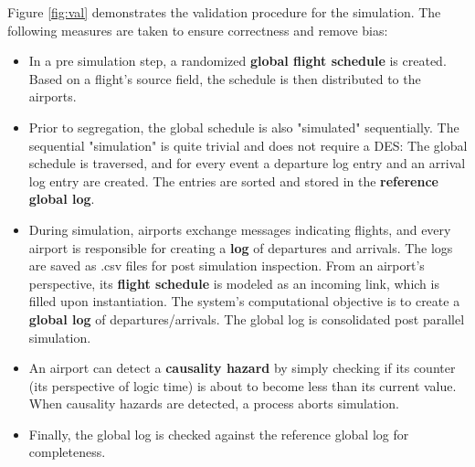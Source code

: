 \documentclass[11pt]{article}
\begin{document}
Figure \ref{fig:val} demonstrates the validation procedure for the simulation.
The following measures are taken to ensure correctness and remove bias:
\begin{itemize}
\item In a pre simulation step, a randomized \textbf{global flight schedule} is created.
Based on a flight's source field, the schedule is then distributed to the airports.
\item Prior to segregation, the global schedule is also "simulated" sequentially. 
The sequential "simulation" is quite trivial and does not require a DES:
The global schedule is traversed, and for every event a departure log entry and an arrival log entry are created.
The entries are sorted and stored in the \textbf{reference global log}.
\item During simulation, airports exchange messages indicating flights, and every airport is responsible for creating a \textbf{log} of departures and arrivals.
The logs are saved as .csv files for post simulation inspection.
From an airport's perspective, its \textbf{flight schedule} is modeled as an incoming link, which is filled upon instantiation.
The system's computational objective is to create a \textbf{global log} of departures/arrivals.
The global log is consolidated post parallel simulation.
\item An airport can detect a \textbf{causality hazard} by simply checking if its counter (its perspective of logic time) is about to become less than its current value.
When causality hazards are detected, a process aborts simulation.
\item Finally, the global log is checked against the reference global log for completeness.
\end{itemize}
\end{document}
